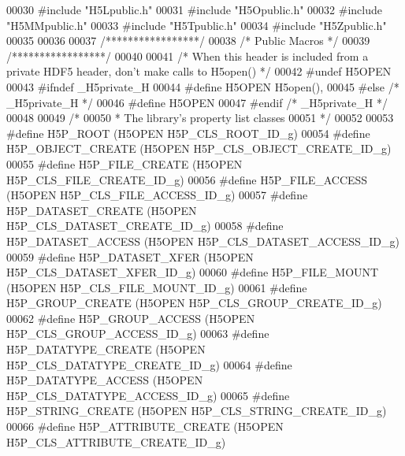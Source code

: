 \begin{DoxyCode}
00030 \textcolor{preprocessor}{#include "H5Lpublic.h"}
00031 \textcolor{preprocessor}{#include "H5Opublic.h"}
00032 \textcolor{preprocessor}{#include "H5MMpublic.h"}
00033 \textcolor{preprocessor}{#include "H5Tpublic.h"}
00034 \textcolor{preprocessor}{#include "H5Zpublic.h"}
00035 
00036 
00037 \textcolor{comment}{/*****************/}
00038 \textcolor{comment}{/* Public Macros */}
00039 \textcolor{comment}{/*****************/}
00040 
00041 \textcolor{comment}{/* When this header is included from a private HDF5 header, don't make calls to H5open() */}
00042 \textcolor{preprocessor}{#undef H5OPEN}
00043 \textcolor{preprocessor}{#ifndef \_H5private\_H}
00044 \textcolor{preprocessor}{#define H5OPEN        H5open(),}
00045 \textcolor{preprocessor}{#else   }\textcolor{comment}{/* \_H5private\_H */}\textcolor{preprocessor}{}
00046 \textcolor{preprocessor}{#define H5OPEN}
00047 \textcolor{preprocessor}{#endif  }\textcolor{comment}{/* \_H5private\_H */}\textcolor{preprocessor}{}
00048 
00049 \textcolor{comment}{/*}
00050 \textcolor{comment}{ * The library's property list classes}
00051 \textcolor{comment}{ */}
00052 
00053 \textcolor{preprocessor}{#define H5P\_ROOT            (H5OPEN H5P\_CLS\_ROOT\_ID\_g)}
00054 \textcolor{preprocessor}{#define H5P\_OBJECT\_CREATE       (H5OPEN H5P\_CLS\_OBJECT\_CREATE\_ID\_g)}
00055 \textcolor{preprocessor}{#define H5P\_FILE\_CREATE         (H5OPEN H5P\_CLS\_FILE\_CREATE\_ID\_g)}
00056 \textcolor{preprocessor}{#define H5P\_FILE\_ACCESS         (H5OPEN H5P\_CLS\_FILE\_ACCESS\_ID\_g)}
00057 \textcolor{preprocessor}{#define H5P\_DATASET\_CREATE          (H5OPEN H5P\_CLS\_DATASET\_CREATE\_ID\_g)}
00058 \textcolor{preprocessor}{#define H5P\_DATASET\_ACCESS          (H5OPEN H5P\_CLS\_DATASET\_ACCESS\_ID\_g)}
00059 \textcolor{preprocessor}{#define H5P\_DATASET\_XFER            (H5OPEN H5P\_CLS\_DATASET\_XFER\_ID\_g)}
00060 \textcolor{preprocessor}{#define H5P\_FILE\_MOUNT              (H5OPEN H5P\_CLS\_FILE\_MOUNT\_ID\_g)}
00061 \textcolor{preprocessor}{#define H5P\_GROUP\_CREATE        (H5OPEN H5P\_CLS\_GROUP\_CREATE\_ID\_g)}
00062 \textcolor{preprocessor}{#define H5P\_GROUP\_ACCESS        (H5OPEN H5P\_CLS\_GROUP\_ACCESS\_ID\_g)}
00063 \textcolor{preprocessor}{#define H5P\_DATATYPE\_CREATE         (H5OPEN H5P\_CLS\_DATATYPE\_CREATE\_ID\_g)}
00064 \textcolor{preprocessor}{#define H5P\_DATATYPE\_ACCESS         (H5OPEN H5P\_CLS\_DATATYPE\_ACCESS\_ID\_g)}
00065 \textcolor{preprocessor}{#define H5P\_STRING\_CREATE       (H5OPEN H5P\_CLS\_STRING\_CREATE\_ID\_g)}
00066 \textcolor{preprocessor}{#define H5P\_ATTRIBUTE\_CREATE        (H5OPEN H5P\_CLS\_ATTRIBUTE\_CREATE\_ID\_g)}

\end{DoxyCode}
